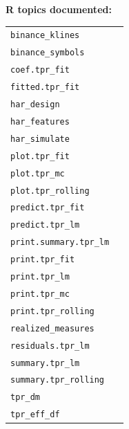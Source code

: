 \documentclass[10pt,a4paper]{report}
\begin{document}
\vspace{14pt}
\noindent\textbf{\large R topics documented:}
\vspace{6pt}
\begin{longtable}{@{}p{}@{\extracolsep{\fill}}r@{}}
\texttt{binance\_klines} \dotfill & \pageref{ent:binanceklines} \\
\texttt{binance\_symbols} \dotfill & \pageref{ent:binancesymbols} \\
\texttt{coef.tpr\_fit} \dotfill & \pageref{ent:coeftprfit} \\
\texttt{fitted.tpr\_fit} \dotfill & \pageref{ent:fittedtprfit} \\
\texttt{har\_design} \dotfill & \pageref{ent:hardesign} \\
\texttt{har\_features} \dotfill & \pageref{ent:harfeatures} \\
\texttt{har\_simulate} \dotfill & \pageref{ent:harsimulate} \\
\texttt{plot.tpr\_fit} \dotfill & \pageref{ent:plottprfit} \\
\texttt{plot.tpr\_mc} \dotfill & \pageref{ent:plottprmc} \\
\texttt{plot.tpr\_rolling} \dotfill & \pageref{ent:plottprrolling} \\
\texttt{predict.tpr\_fit} \dotfill & \pageref{ent:predicttprfit} \\
\texttt{predict.tpr\_lm} \dotfill & \pageref{ent:predicttprlm} \\
\texttt{print.summary.tpr\_lm} \dotfill & \pageref{ent:printsummarytprlm} \\
\texttt{print.tpr\_fit} \dotfill & \pageref{ent:printtprfit} \\
\texttt{print.tpr\_lm} \dotfill & \pageref{ent:printtprlm} \\
\texttt{print.tpr\_mc} \dotfill & \pageref{ent:printtprmc} \\
\texttt{print.tpr\_rolling} \dotfill & \pageref{ent:printtprrolling} \\
\texttt{realized\_measures} \dotfill & \pageref{ent:realizedmeasures} \\
\texttt{residuals.tpr\_lm} \dotfill & \pageref{ent:residualstprlm} \\
\texttt{summary.tpr\_lm} \dotfill & \pageref{ent:summarytprlm} \\
\texttt{summary.tpr\_rolling} \dotfill & \pageref{ent:summarytprrolling} \\
\texttt{tpr\_dm} \dotfill & \pageref{ent:tprdm} \\
\texttt{tpr\_eff\_df} \dotfill & \pageref{ent:tpreffdf} \\

\end{longtable}
\end{document}
